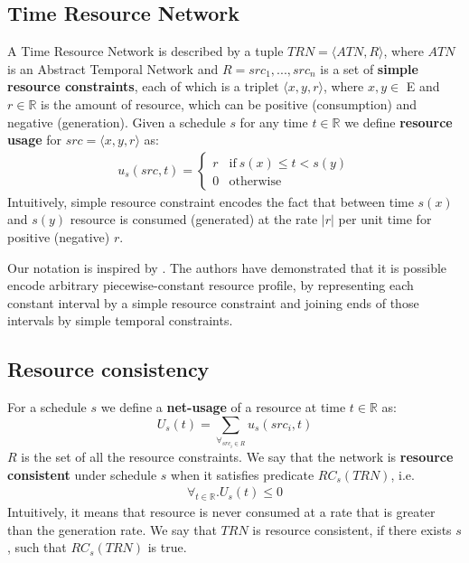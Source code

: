 \subsection{Time Resource Network}
\label{sec:trn_definition}
A Time Resource Network is described by a tuple $TRN = \langle ATN, R \rangle$, where $ATN$ is an Abstract Temporal Network and $R={src_1, ..., src_n}$ is a set of \textbf{simple resource constraints}, each of which is a triplet $ \langle x, y, r \rangle$, where $x, y \in$ E and $r \in \mathbb{R}$ is the amount of resource, which can be positive (consumption) and negative (generation). Given a schedule $s$ for any time $t \in \mathbb{R}$ we define \textbf{resource usage} for $src=\langle x,y,r \rangle$ as:
\begin{align*}
u_s(src, t) = \begin{cases}
r & \text{if}\ s(x) \leq t < s(y)\\
0 & \text{otherwise}
\end{cases}
\end{align*}
Intuitively, simple resource constraint encodes the fact that between time $s(x)$ and $s(y)$  resource is consumed (generated) at the rate $|r|$ per unit time for positive (negative) $r$.

Our notation is inspired by \cite{bartusch1988scheduling}. The authors have demonstrated that it is possible encode arbitrary piecewise-constant resource profile, by representing each constant interval by a simple resource constraint and joining ends of those intervals by simple temporal constraints.


\subsection{Resource consistency}
For a schedule $s$ we define a \textbf{net-usage} of a resource at time $t \in \mathbb{R}$ as:
\[
U_s(t) = \sum_{\forall_{src_i \in R}} u_s(src_i, t)
\]
$R$ is the set of all the resource constraints. We say that the network is \textbf{resource consistent} under schedule $s$ when it satisfies predicate $RC_s(TRN)$, i.e.
\begin{align}
\label{usage_for_all}\forall_{t \in \mathbb{R}} . U_s(t) \leq 0
\end{align}
Intuitively, it means that resource is never consumed at a rate that is greater than the generation rate. We say that $TRN$ is resource consistent, if there exists $s$, such that $RC_s(TRN)$ is true.

